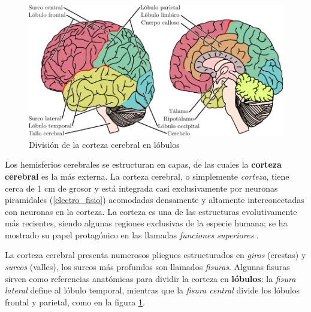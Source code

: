 \begin{figure}
\centering
\includegraphics[width=0.7\linewidth]{./img_diagramas/cerebro_zonas_limpio.pdf} 
\caption{División de la corteza cerebral en lóbulos}
\label{lobulos}
\end{figure}

Los hemisferios cerebrales se estructuran en capas, de las cuales la \textbf{corteza cerebral} es
la más externa. La corteza cerebral, o simplemente \textit{corteza}, tiene cerca de 1 cm de grosor 
y está integrada casi exclusivamente por neuronas piramidales (\ref{electro_fisio}) acomodadas 
densamente y altamente interconectadas con neuronas en la corteza. 
La corteza es una de las estructuras evolutivamente más recientes, siendo algunas regiones 
exclusivas de la especie humana; se ha mostrado su papel protagónico en 
las llamadas \textit{funciones superiores} \cite{Clark98_2}.

La corteza cerebral presenta numerosos pliegues estructurados en \textit{giros} (crestas) y
\textit{surcos} (valles), los surcos más profundos son llamados \textit{fisuras}. Algunas 
fisuras sirven como referencias anatómicas para dividir la corteza en \textbf{lóbulos}:
la \textit{fisura lateral} define al lóbulo temporal, mientras que la \textit{fisura central} divide 
los lóbulos frontal y parietal, como en la figura \ref{lobulos}.



